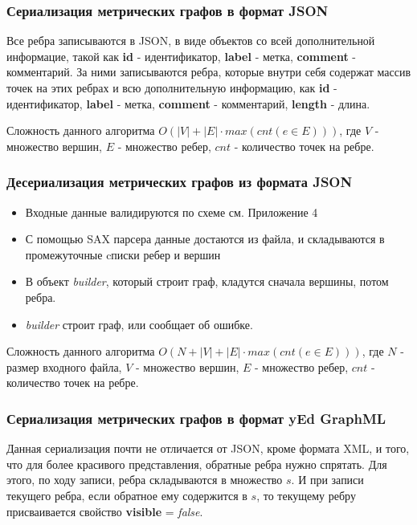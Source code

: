 \documentclass{../TechDoc}
\begin{document}
	\subsubsection{Сериализация метрических графов в формат JSON\cite{JSON}}
		Все ребра записываются в JSON, в виде объектов со всей дополнительной информацие, такой как \textbf{id} - идентификатор, \textbf{label} - метка, \textbf{comment} - комментарий. За ними записываются ребра, которые внутри себя содержат массив точек на этих ребрах и всю дополнительную информацию, как \textbf{id} - идентификатор, \textbf{label} - метка, \textbf{comment} - комментарий, \textbf{length} - длина.
		
		Сложность данного алгоритма $O(|V| + |E| \cdot max(cnt(e \in E)))$, где $V$ - множество вершин, $E$ - множество ребер, $cnt$ - количество точек на ребре.
		
	\subsubsection{Десериализация метрических графов из формата JSON}
		\begin{itemize}
			\item Входные данные валидируются по схеме\cite{jsonschema} см. Приложение 4
			\item С помощью SAX\cite{SAX} парсера данные достаются из файла, и складываются в промежуточные cписки ребер и вершин
			\item В объект \textit{builder}, который строит граф, кладутся сначала вершины, потом ребра.
			\item \textit{builder} строит граф, или сообщает об ошибке.
		\end{itemize}
	
		Сложность данного алгоритма $O(N + |V| + |E| \cdot max(cnt(e \in E)))$, где $N$ - размер входного файла, $V$ - множество вершин, $E$ - множество ребер, $cnt$ - количество точек на ребре.
		
	\subsubsection{Сериализация метрических графов в формат yEd GraphML\cite{yedgraphml}}
		Данная сериализация почти не отличается от JSON, кроме формата XML, и того, что для более красивого представления, обратные ребра нужно спрятать. Для этого, по ходу записи, ребра складываются в множество $s$. И при записи текущего ребра, если обратное ему содержится в $s$, то текущему ребру присваивается свойство \textbf{visible} = \textit{false}.
		
\end{document}

